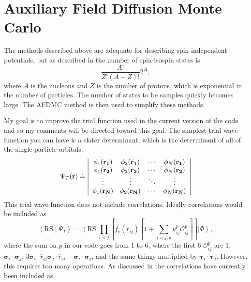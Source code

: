 \section*{Auxiliary Field Diffusion Monte Carlo}
The methods described above are adequate for describing spin-independent potentials, but as described in \cite{schmidt1999} the number of spin-isospin states is 
\begin{equation}
  \frac{A!}{Z!(A-Z)!}2^A,
\end{equation}
where $A$ is the nucleons and $Z$ is the number of protons, which is exponential in the number of particles. The number of states to be samples quickly becomes large. The AFDMC method is then used to simplify these methods.

My goal is to improve the trial function used in the current version of the code and so my comments will be directed toward this goal. The simplest trial wave function you can have is a slater determinant, which is the determinant of all of the single particle orbitals.
\begin{equation}
  \Psi_T(\mathbf{r}) \doteq \left| \\
  \begin{array}{cccc}
    \phi_1(\mathbf{r_1}) & \phi_2(\mathbf{r_1})  & \cdots & \phi_N(\mathbf{r_1})  \\
    \phi_1(\mathbf{r_2})  & \phi_2(\mathbf{r_2})  & \cdots & \phi_N(\mathbf{r_2})  \\
    \vdots & \vdots & \ddots & \vdots \\
    \phi_1(\mathbf{r_N})  & \phi_2(\mathbf{r_N})  & \cdots & \phi_N(\mathbf{r_N})  
  \end{array} \right|
\end{equation} 
This trial wave function does not include correlations. Ideally correlations would be included as
\begin{equation}
  \left<\mathrm{RS}\middle|\Psi_T\right> = \left<\mathrm{RS}\right| \prod\limits_{i<j}\left[f_c(r_{ij})\left[1+\sum\limits_{i<j,p}u_{ij}^p\mathcal{O}_{ij}^p\right]\right] \left|\Phi\right>,
  \label{equ:corrfull}
\end{equation}
where the sum on $p$ in our code goes from $1$ to $6$, where the first 6 $\mathcal{O}_{ij}^p$ are $1$, $\mathbf{\sigma}_i \cdot \mathbf{\sigma}_j$, $3\mathbf{\sigma}_i \cdot \hat{r}_{ij}\mathbf{\sigma}_j \cdot \hat{r}_{ij} - \mathbf{\sigma}_i \cdot \mathbf{\sigma}_j$, and the same things multiplied by $\mathbf{\tau}_i \cdot \mathbf{\tau}_j$. However, this requires too many operations. As discussed in \cite{gandolfi2014} the correlations have currently been included as
